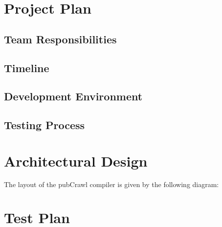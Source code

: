 \documentclass[oneside]{book}
\begin{document}



\chapter{Project Plan}

\section{Team Responsibilities}

\section{Timeline}

\section{Development Environment}

\section{Testing Process}


\chapter{Architectural Design}

The layout of the pubCrawl compiler is given by the following diagram: 





\chapter{Test Plan}
\end{document}
